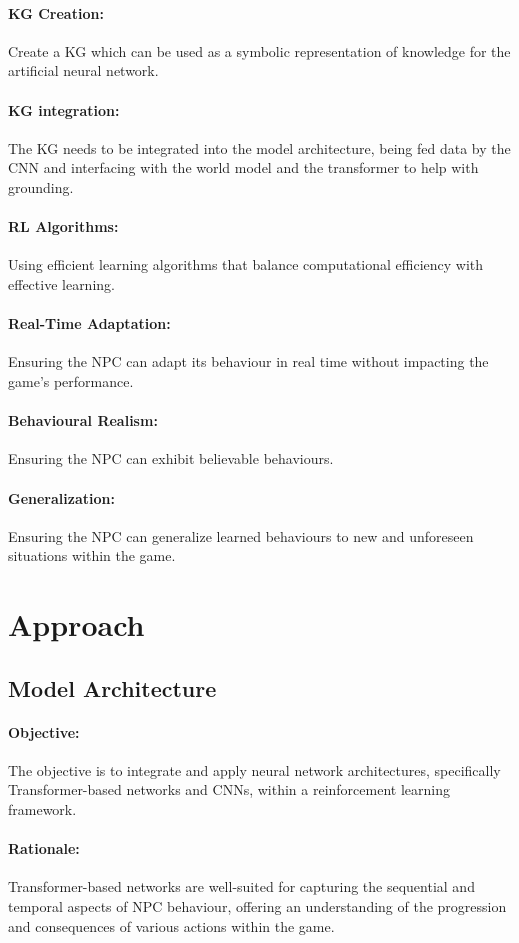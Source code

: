 \documentclass{article}
\begin{document}
\paragraph{KG Creation:}
Create a KG which can be used as a symbolic representation of knowledge for the artificial neural network.
\paragraph{KG integration:}
The KG needs to be integrated into the model architecture, being fed data by the CNN and interfacing with the world model and the transformer to help with grounding.
\paragraph{RL Algorithms:}
Using efficient learning algorithms that balance computational efficiency with effective learning.
\paragraph{Real-Time Adaptation:}
Ensuring the NPC can adapt its behaviour in real time without impacting the game’s performance.
\paragraph{Behavioural Realism:}
Ensuring the NPC can exhibit believable behaviours.
\paragraph{Generalization:}
Ensuring the NPC can generalize learned behaviours to new and unforeseen situations within the game.

\section{Approach}

\subsection{Model Architecture}
\paragraph{Objective:}
The objective is to integrate and apply neural network architectures, specifically Transformer-based networks and CNNs, within a reinforcement learning framework.

\paragraph{Rationale:}
Transformer-based networks are well-suited for capturing the sequential and temporal aspects of NPC behaviour, offering an understanding of the progression and consequences of various actions within the game.
\end{document}
